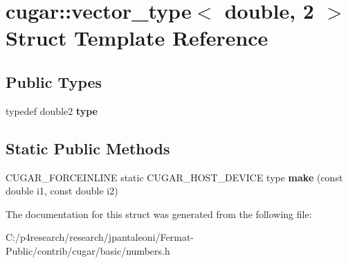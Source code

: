 \hypertarget{structcugar_1_1vector__type_3_01double_00_012_01_4}{}\section{cugar\+:\+:vector\+\_\+type$<$ double, 2 $>$ Struct Template Reference}
\label{structcugar_1_1vector__type_3_01double_00_012_01_4}
\subsection*{Public Types}
\begin{DoxyCompactItemize}
\item 
\mbox{\label{structcugar_1_1vector__type_3_01double_00_012_01_4_ac29e3e33ff7305a99a8935703f462616}} 
typedef double2 {\bfseries type}
\end{DoxyCompactItemize}
\subsection*{Static Public Methods}
\begin{DoxyCompactItemize}
\item 
\mbox{\label{structcugar_1_1vector__type_3_01double_00_012_01_4_aefde3ff609797ef6a1927228b041fb84}} 
C\+U\+G\+A\+R\+\_\+\+F\+O\+R\+C\+E\+I\+N\+L\+I\+NE static C\+U\+G\+A\+R\+\_\+\+H\+O\+S\+T\+\_\+\+D\+E\+V\+I\+CE type {\bfseries make} (const double i1, const double i2)
\end{DoxyCompactItemize}


The documentation for this struct was generated from the following file\+:\begin{DoxyCompactItemize}
\item 
C\+:/p4research/research/jpantaleoni/\+Fermat-\/\+Public/contrib/cugar/basic/numbers.\+h\end{DoxyCompactItemize}
